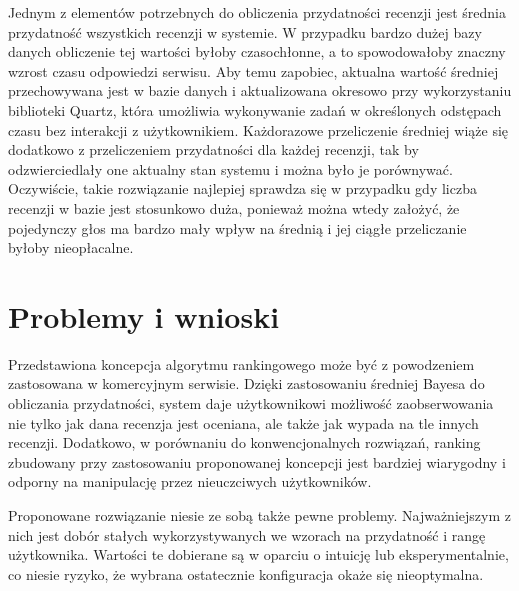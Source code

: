 Jednym z elementów potrzebnych do obliczenia przydatności recenzji jest średnia przydatność wszystkich recenzji w systemie. W przypadku bardzo dużej bazy danych obliczenie tej wartości byłoby czasochłonne, a to spowodowałoby znaczny wzrost czasu odpowiedzi serwisu. Aby temu zapobiec, aktualna wartość średniej przechowywana jest w bazie danych i aktualizowana okresowo przy wykorzystaniu biblioteki Quartz, która umożliwia wykonywanie zadań w określonych odstępach czasu bez interakcji z użytkownikiem.\cite{quartz} Każdorazowe przeliczenie średniej wiąże się dodatkowo z przeliczeniem przydatności dla każdej recenzji, tak by odzwierciedlały one aktualny stan systemu i można było je porównywać. Oczywiście, takie rozwiązanie najlepiej sprawdza się w przypadku gdy liczba  recenzji w bazie jest stosunkowo duża, ponieważ można wtedy założyć, że pojedynczy głos ma bardzo mały wpływ na średnią i jej ciągłe przeliczanie byłoby nieopłacalne.

\section{Problemy i wnioski}

Przedstawiona koncepcja algorytmu rankingowego może być z powodzeniem zastosowana w komercyjnym serwisie. Dzięki zastosowaniu średniej Bayesa do obliczania przydatności, system daje użytkownikowi możliwość zaobserwowania nie tylko jak dana recenzja jest oceniana, ale także jak wypada na tle innych recenzji. Dodatkowo, w porównaniu do konwencjonalnych rozwiązań, ranking zbudowany przy zastosowaniu proponowanej koncepcji jest bardziej wiarygodny i odporny na manipulację przez nieuczciwych użytkowników.

Proponowane rozwiązanie niesie ze sobą także pewne problemy. Najważniejszym z nich jest dobór stałych wykorzystywanych we wzorach na przydatność i rangę użytkownika. Wartości te dobierane są w oparciu o intuicję lub eksperymentalnie, co niesie ryzyko, że wybrana ostatecznie konfiguracja okaże się nieoptymalna.
